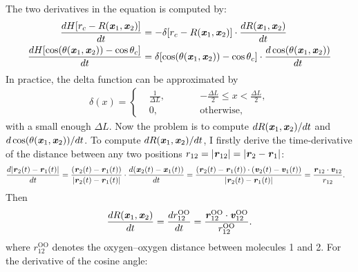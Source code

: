 \documentclass[unsortedaddress,a4paper,onecolumn]{revtex4}
\newcommand{\vect}[1]{\textbf{\textit{#1}}}
\newcommand{\oxy}[0]{{\textrm{O}}}
\begin{document}
The two derivatives in the equation is computed by:
\begin{align}
  \frac{dH [r_c - R(\vect x_1, \vect x_2)]}{dt}
  &=
  -\delta[r_c - R(\vect x_1, \vect x_2)]
  \cdot  \frac{dR(\vect x_1, \vect x_2)}{dt} \\
  \frac{dH[\cos(\theta(\vect x_1, \vect x_2)) - \cos \theta_c]}{dt}
  &=
  \delta[\cos(\theta(\vect x_1, \vect x_2)) - \cos \theta_c]
  \cdot \frac{d \cos(\theta(\vect x_1, \vect x_2))}{dt}
\end{align}
In practice, the delta function can be approximated by
\begin{align}
  \delta(x) =
  \left\{
    \begin{alignedat}{3}
      &\frac 1{\Delta L}, &\qquad& -\frac{\Delta L}{2} \leq x < \frac{\Delta L}{2}, \\
      & 0, &     & \textrm{otherwise},
    \end{alignedat}
  \right.
\end{align}
with a small enough $\Delta L$.
Now the problem is to compute $dR(\vect x_1, \vect x_2)/dt$ and $d
\cos(\theta(\vect x_1, \vect x_2))/dt$. To compute $dR(\vect x_1,
\vect x_2)/dt$, I firstly derive the time-derivative of the distance
between any two positions $r_{12} = \vert \vect r_{12}\vert  = \vert \vect r_2 - \vect r_1\vert$:
\begin{align} 
  \frac{d\vert \vect r_2(t) - \vect r_1(t)\vert}{dt}
  &=
  \frac{( \vect r_2(t) - \vect r_1(t) )}{  \vert \vect r_2(t) - \vect r_1(t)\vert} \cdot
  \frac{ d( \vect x_2(t) - \vect x_1(t) )}{dt}  
  =
  \frac{( \vect r_2(t) - \vect r_1(t) ) \cdot (\vect v_2(t) - \vect v_1(t))}{  \vert \vect r_2(t) - \vect r_1(t)\vert} 
  =
  \frac{\vect r_{12}\cdot \vect v_{12}}{r_{12}}.
\end{align}
Then
\begin{align}
  \frac{dR(\vect x_1, \vect x_2)}{dt} = \frac{d r^{\oxy\oxy}_{12}}{dt} = \frac{\vect r^{\oxy\oxy}_{12}\cdot \vect v^{\oxy\oxy}_{12}}{r^{\oxy\oxy}_{12}}.
\end{align}
where $r_{12}^{\oxy\oxy}$ denotes the oxygen--oxygen distance between molecules 1 and 2. For the derivative of the cosine angle:
\end{document}
